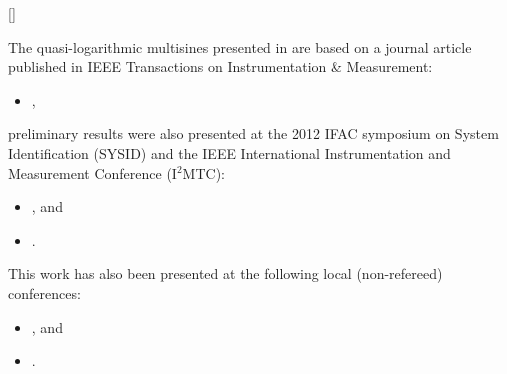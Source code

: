 \begin{refsection}

\makeatletter
\DeclareCiteCommand{\fullcite}
  {%
    }
  {\usedriver
     {}
     {}}
  {\multicitedelim}
  {}
\DeclareCiteCommand{\footfullcite}[\mkbibfootnote]
  {%
    }
  {\usedriver
     {}
     {}}
  {\multicitedelim}
  {}
\makeatother


The quasi-logarithmic multisines presented in  are based on a journal article published in \gls{IEEE} Transactions on Instrumentation \& Measurement:
\begin{itemize}
  \item {}, 
\end{itemize}
preliminary results were also presented at the 2012 \gls{IFAC} symposium on System Identification (\textsc{SYSID}) and the \gls{IEEE} International Instrumentation and Measurement Conference (\textsc{I$^{\text{2}}$MTC}):
\begin{itemize}
  \item {}, and
  \item {}.
\end{itemize}
This work has also been presented at the following local (non-refereed) conferences:
\begin{itemize}
  \item {}, and
  \item {}.
\end{itemize}


\end{refsection}
